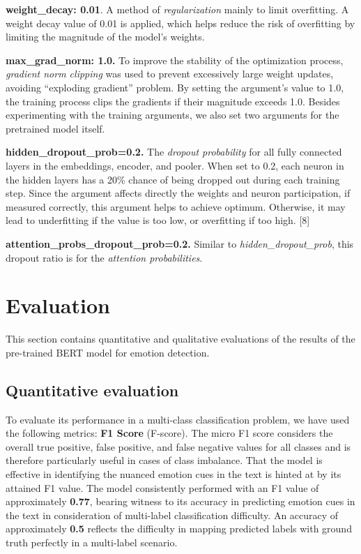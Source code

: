 \documentclass[11pt]{article}
\begin{document}
\textbf{weight\_decay: 0.01}. A method of \textit{regularization} mainly to limit overfitting. A weight decay value of 0.01 is applied, which helps reduce the risk of overfitting by limiting the magnitude of the model’s weights.

\textbf{max\_grad\_norm: 1.0. }To improve the stability of the optimization process, \textit{gradient norm clipping} was used to prevent excessively large weight updates, avoiding “exploding gradient” problem. By setting the argument’s value to 1.0, the training process clips the gradients if their magnitude exceeds 1.0. 
Besides experimenting with the training arguments, we also set two arguments for the pretrained model itself.

\textbf{hidden\_dropout\_prob=0.2.} The \textit{dropout probability} for all fully connected layers in the embeddings, encoder, and pooler. When set to 0.2, each neuron in the hidden layers has a 20\% chance of being dropped out during each training step. Since the argument affects directly the weights and neuron participation, if measured correctly, this argument helps to achieve optimum. Otherwise, it may lead to underfitting if the value is too low, or overfitting if too high. [8]

\textbf{attention\_probs\_dropout\_prob=0.2.} Similar to \textit{hidden\_dropout\_prob}, this dropout ratio is for the \textit{attention probabilities}. 


\section{Evaluation}
This section contains quantitative and qualitative evaluations of the results of the pre-trained BERT model for emotion detection.
\subsection{Quantitative evaluation}
To evaluate its performance in a multi-class classification problem, we have used the following metrics:
\textbf{F1 Score} (F-score). The micro F1 score considers the overall true positive, false positive, and false negative values for all classes and is therefore particularly useful in cases of class imbalance. That the model is effective in identifying the nuanced emotion cues in the text is hinted at by its attained F1 value. The model consistently performed with an F1 value of approximately \textbf{0.77}, bearing witness to its accuracy in predicting emotion cues in the text in consideration of multi-label classification difficulty. An accuracy of approximately \textbf{0.5} reflects the difficulty in mapping predicted labels with ground truth perfectly in a multi-label scenario.
\end{document}
